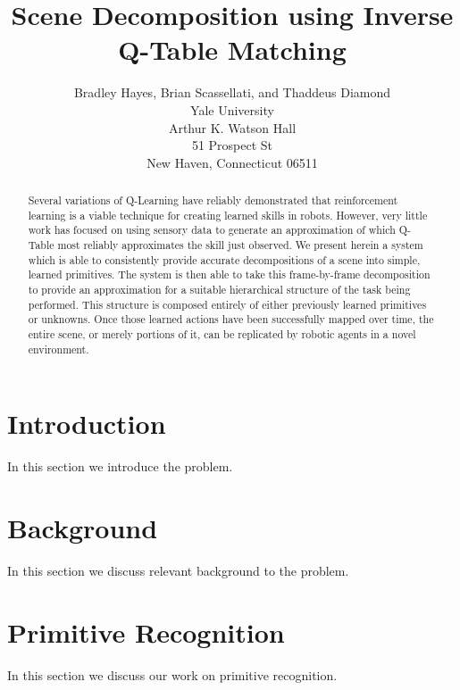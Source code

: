\documentclass[letterpaper]{article}
\begin{document}
\title{Scene Decomposition using Inverse Q-Table Matching}
\author{Bradley Hayes, Brian Scassellati, and Thaddeus Diamond\\
Yale University\\
Arthur K. Watson Hall\\
51 Prospect St\\
New Haven, Connecticut 06511\\
}

\maketitle

\begin{abstract}
Several variations of Q-Learning have reliably demonstrated that reinforcement
learning is a viable technique for creating learned skills in robots.  However,
very little work has focused on using sensory data to generate an approximation
of which Q-Table most reliably approximates the skill just observed.  We present
herein a system which is able to consistently provide accurate decompositions of
a scene into simple, learned primitives.  The system is then able to take this
frame-by-frame decomposition to provide an approximation for a suitable 
hierarchical structure of the task being performed.  This structure is composed
entirely of either previously learned primitives or unknowns.  Once those
learned actions have been successfully mapped over time, the entire scene, or
merely portions of it, can be replicated by robotic agents in a novel
environment.  
\end{abstract}

\section{Introduction}
\label{sec:intro}
In this section we introduce the problem.

\section{Background}
\label{sec:background}
In this section we discuss relevant background to the problem.

\section{Primitive Recognition}
\label{sec:recognition}
In this section we discuss our work on primitive recognition.
\end{document}
